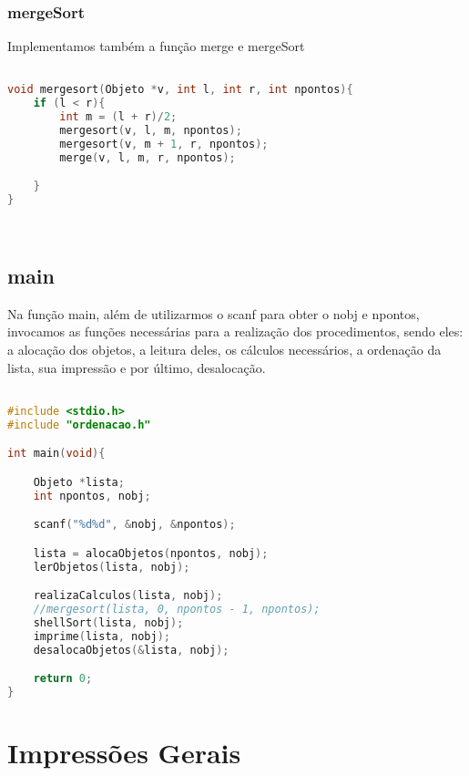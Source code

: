 \documentclass{article}
\begin{document}
\subsubsection{mergeSort}

Implementamos também a função merge e mergeSort

\begin{lstlisting}[caption={Função mergeSort},label={lst:cod7},language=C]

void mergesort(Objeto *v, int l, int r, int npontos){
    if (l < r){
        int m = (l + r)/2;
        mergesort(v, l, m, npontos);
        mergesort(v, m + 1, r, npontos);
        merge(v, l, m, r, npontos);

    }
}

    
\end{lstlisting}

\clearpage
\subsection{main}

Na função main, além de utilizarmos o scanf para obter o nobj e npontos, invocamos as funções necessárias para a realização dos procedimentos, sendo eles: a alocação dos objetos, a leitura deles, os cálculos necessários, a ordenação da lista, sua impressão e por último, desalocação.

\begin{lstlisting}[caption={função main},label={lst:cod11},language=C]

#include <stdio.h>
#include "ordenacao.h"

int main(void){

    Objeto *lista;
    int npontos, nobj;

    scanf("%d%d", &nobj, &npontos);

    lista = alocaObjetos(npontos, nobj);
    lerObjetos(lista, nobj);

    realizaCalculos(lista, nobj);
    //mergesort(lista, 0, npontos - 1, npontos);
    shellSort(lista, nobj);
    imprime(lista, nobj);
    desalocaObjetos(&lista, nobj);

    return 0;
}

\end{lstlisting}

\clearpage


\section{Impressões Gerais}
\end{document}
